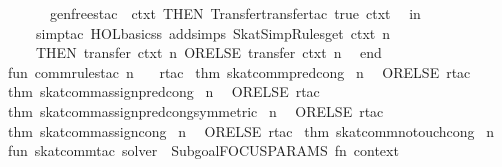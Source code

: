 \begin{isabellebody}
\ \ \ \ \ \ gen{}frees{}tac\ {}{}\ ctxt\ THEN{}\ Transfer{}transfer{}tac\ true\ ctxt\isanewline
\ \ in\isanewline
\ \ \ \ simp{}tac\ {}HOL{}basic{}ss\ addsimps\ SkatSimpRules{}get\ ctxt{}\ n\isanewline
\ \ \ \ THEN\ {}transfer{}\ ctxt\ n\ ORELSE\ transfer{}\ ctxt\ n{}\isanewline
\ \ end\isanewline
\isanewline
fun\ comm{}rules{}tac\ n\ {}\isanewline
\ \ rtac\ %
\isaantiq
thm\ skat{}comm{}pred{}cong{}%
\endisaantiq
\ n\isanewline
\ \ ORELSE\ rtac\ %
\isaantiq
thm\ skat{}comm{}assign{}pred{}cong{}%
\endisaantiq
\ n\isanewline
\ \ ORELSE\ rtac\ %
\isaantiq
thm\ skat{}comm{}assign{}pred{}cong{}symmetric{}{}%
\endisaantiq
\ n\isanewline
\ \ ORELSE\ rtac\ %
\isaantiq
thm\ skat{}comm{}assign{}cong{}%
\endisaantiq
\ n\isanewline
\ \ ORELSE\ rtac\ %
\isaantiq
thm\ skat{}comm{}no{}touch{}cong{}%
\endisaantiq
\ n\isanewline
\isanewline
fun\ skat{}comm{}tac\ solver\ {}\ Subgoal{}FOCUS{}PARAMS\ {}fn\ {}context{}\ {}{}{}{}\ {}{}\isanewline

\end{isabellebody}

